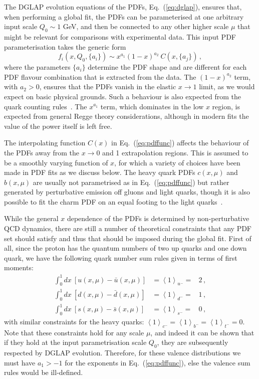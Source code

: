 The DGLAP evolution equations of the PDFs, Eq.~(\ref{eq:dglap}), ensures that, when performing a global fit, the PDFs can be parameterised at one arbitrary input scale $Q_0\sim 1$ GeV, and
then be connected to any other higher scale $\mu$ that might be relevant
for comparisons with experimental data.
%
This input PDF parameterisation takes the generic form
\begin{equation}
\label{eq:pdffunc}
f_{i}(x,Q_0,\{a_i\})\sim x^{a_1}(1-x)^{a_2}\:C(x,\{a_j\})\, ,
\end{equation}
where the parameters $\{a_i\}$ determine the PDF shape
and are different for each PDF flavour combination that
is extracted from the data.
%
The $(1-x)^{a_2}$ term, with $a_{2}>0$, ensures that the PDFs
vanish in the elastic $x\to 1$ limit, as we would expect on basic physical grounds. 
%
Such a behaviour is also expected from the quark
counting rules~\cite{Brodsky:1973kr,Ball:2016spl}.
%
The $x^{a_1}$ term, which dominates in the low $x$
region, is expected from general Regge theory considerations,
although in modern fits the value of the power itself is left free.


The interpolating function $C(x)$ in
Eq.~(\ref{eq:pdffunc})
affects the behaviour of the PDFs away from the $x\to 0$ and 1
extrapolation regions.
%
This is assumed to be a smoothly varying function of $x$, for which a variety of choices have been made in PDF fits as we discuss below.
%
The heavy quark PDFs $c(x,\mu)$ and $b(x,\mu)$ are usually not
parametrised as in  Eq.~(\ref{eq:pdffunc}) but rather
generated by perturbative emission off gluons and light quarks,
though it is also possible to fit the charm PDF on an equal footing
to the light quarks~\cite{Ball:2016neh}.

While the general $x$ dependence of the PDFs is determined by
non-perturbative QCD dynamics, there are still a number
of theoretical constraints that any PDF set should satisfy and thus that
should be imposed during the global fit.
%
First of all, since
the proton has the quantum numbers of two up quarks and one down quark,
we have the following quark number sum rules given in terms of first
moments: 
%
\begin{eqnarray}
\int_{0}^{1}dx\ \left[u(x,\mu)-\bar{u}(x,\mu)\right] & =\left\langle 1\right\rangle _{u^{-}}= & 2 \, ,\nonumber \\
\int_{0}^{1}dx\ \left[d(x,\mu)-\bar{d}(x,\mu)\right] & =\left\langle 1\right\rangle _{d^{-}}= & 1 \, ,
\label{eq:valencesumrules}\\
\int_{0}^{1}dx\ \left[s(x,\mu)-\bar{s}(x,\mu)\right] & =\left\langle 1\right\rangle _{s^{-}}= & 0 \, ,\nonumber
\end{eqnarray}
with similar constraints for the heavy quarks: $\left\langle 1\right\rangle _{c^{-}}=\left\langle 1\right\rangle _{b^{-}}=\left\langle 1\right\rangle _{t^{-}}=0$.
%
Note that these constraints hold for any scale $\mu$, and indeed it can be shown
that if they hold at the input parametrisation scale $Q_0$, they
are subsequently respected by DGLAP evolution.
%
Therefore, for these valence distributions we must have $a_1>-1$ for the exponents in
Eq.~(\ref{eq:pdffunc}), else the valence sum rules would be ill-defined.

